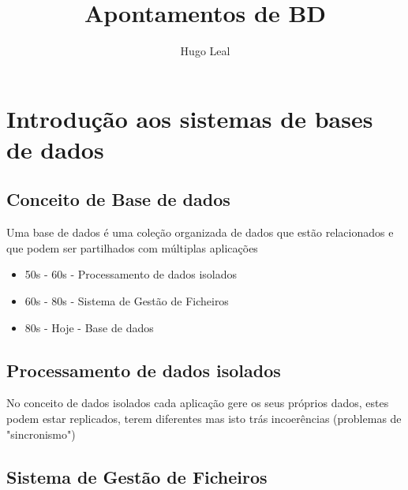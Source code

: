 \documentclass{easyclass}
\begin{document}
\begin{titlepage}
    \title{Apontamentos de BD}
    \author{Hugo Leal}
    \maketitle
\end{titlepage}

\tableofcontents
\clearpage

\section{Introdução aos sistemas de bases de dados}

\subsection{Conceito de Base de dados}
Uma base de dados é uma coleção organizada de dados que estão relacionados e que podem ser partilhados com múltiplas aplicações\\
\begin{tcolorbox}[
colframe=blue!25,
colback=blue!10,
coltitle=blue!20!black,  
fonttitle=\bfseries,
adjusted title=Evolução histórica]

\begin{itemize}
\item 50s - 60s   -   Processamento de dados isolados
\item 60s - 80s   -   Sistema de Gestão de Ficheiros
\item 80s - Hoje  -   Base de dados
\end{itemize}





\end{tcolorbox}

\subsection{Processamento de dados isolados}
No conceito de dados isolados cada aplicação gere os seus próprios dados, estes podem estar replicados, terem diferentes mas isto trás incoerências (problemas de "sincronismo")
\subsection{Sistema de Gestão de Ficheiros}

%
\end{document}
